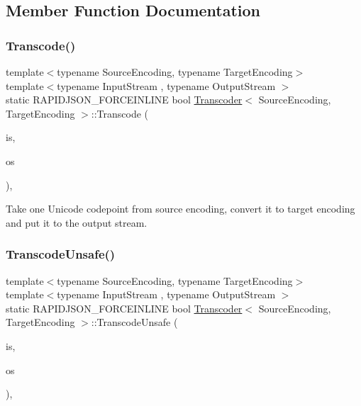 \subsection{Member Function Documentation}
\mbox{\label{structTranscoder_a0ea2edfe35784ebf1063921d2bd5fb66}} 
\subsubsection{\texorpdfstring{Transcode()}{Transcode()}}
{\footnotesize\ttfamily template$<$typename Source\+Encoding, typename Target\+Encoding$>$ \\
template$<$typename Input\+Stream , typename Output\+Stream $>$ \\
static R\+A\+P\+I\+D\+J\+S\+O\+N\+\_\+\+F\+O\+R\+C\+E\+I\+N\+L\+I\+NE bool \hyperlink{structTranscoder}{Transcoder}$<$ Source\+Encoding, Target\+Encoding $>$\+::Transcode (\begin{DoxyParamCaption}\item[{Input\+Stream \&}]{is,  }\item[{Output\+Stream \&}]{os }\end{DoxyParamCaption})\hspace{0.3cm}{\ttfamily [inline]}, {\ttfamily [static]}}



Take one Unicode codepoint from source encoding, convert it to target encoding and put it to the output stream. 

\mbox{\label{structTranscoder_a16345a912c679b2ea197328eb1444f82}} 
\subsubsection{\texorpdfstring{Transcode\+Unsafe()}{TranscodeUnsafe()}}
{\footnotesize\ttfamily template$<$typename Source\+Encoding, typename Target\+Encoding$>$ \\
template$<$typename Input\+Stream , typename Output\+Stream $>$ \\
static R\+A\+P\+I\+D\+J\+S\+O\+N\+\_\+\+F\+O\+R\+C\+E\+I\+N\+L\+I\+NE bool \hyperlink{structTranscoder}{Transcoder}$<$ Source\+Encoding, Target\+Encoding $>$\+::Transcode\+Unsafe (\begin{DoxyParamCaption}\item[{Input\+Stream \&}]{is,  }\item[{Output\+Stream \&}]{os }\end{DoxyParamCaption})\hspace{0.3cm}{\ttfamily [inline]}, {\ttfamily [static]}}

